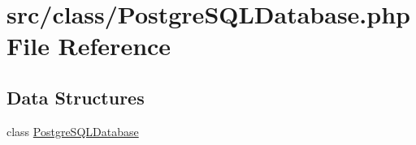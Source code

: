 \hypertarget{_postgre_s_q_l_database_8php}{}\section{src/class/\+Postgre\+S\+Q\+L\+Database.php File Reference}
\label{_postgre_s_q_l_database_8php}
\subsection*{Data Structures}
\begin{DoxyCompactItemize}
\item 
class \hyperlink{class_postgre_s_q_l_database}{Postgre\+S\+Q\+L\+Database}
\end{DoxyCompactItemize}
